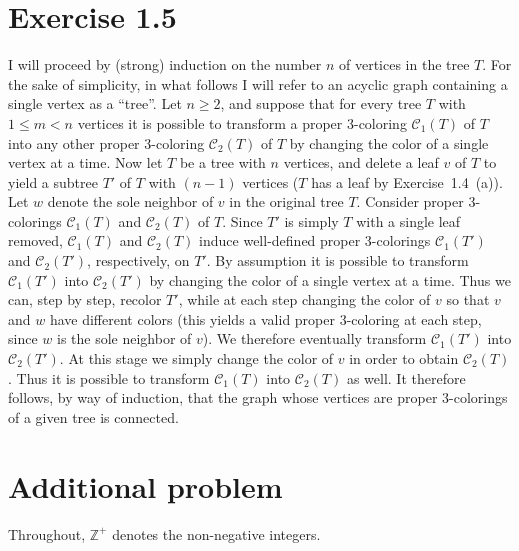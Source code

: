 \documentclass[12pt]{article}
\begin{document}
\section*{Exercise 1.5}

I will proceed by (strong) induction on the number $n$ of vertices in the tree $T$. For the sake of simplicity, in what follows I will refer to an acyclic graph containing a single vertex as a ``tree''. Let $n \geq 2$, and suppose that for every tree $T$ with $1 \leq m < n$ vertices it is possible to transform a proper 3-coloring $\mathcal{C}_1(T)$ of $T$ into any other proper 3-coloring $\mathcal{C}_2(T)$ of $T$ by changing the color of a single vertex at a time. Now let $T$ be a tree with $n$ vertices, and delete a leaf $v$ of $T$ to yield a subtree $T'$ of $T$ with $(n - 1)$ vertices ($T$ has a leaf by Exercise~1.4~(a)). Let $w$ denote the sole neighbor of $v$ in the original tree $T$. Consider proper 3-colorings $\mathcal{C}_1(T)$ and $\mathcal{C}_2(T)$ of $T$. Since $T'$ is simply $T$ with a single leaf removed, $\mathcal{C}_1(T)$ and $\mathcal{C}_2(T)$ induce well-defined proper 3-colorings $\mathcal{C}_1(T')$ and $\mathcal{C}_2(T')$, respectively, on $T'$. By assumption it is possible to transform $\mathcal{C}_1(T')$ into $\mathcal{C}_2(T')$ by changing the color of a single vertex at a time. Thus we can, step by step, recolor $T'$, while at each step changing the color of $v$ so that $v$ and $w$ have different colors (this yields a valid proper 3-coloring at each step, since $w$ is the sole neighbor of $v$). We therefore eventually transform $\mathcal{C}_1(T')$ into $\mathcal{C}_2(T')$. At this stage we simply change the color of $v$ in order to obtain $\mathcal{C}_2(T)$. Thus it is possible to transform $\mathcal{C}_1(T)$ into $\mathcal{C}_2(T)$ as well. It therefore follows, by way of induction, that the graph whose vertices are proper 3-colorings of a given tree is connected.

\section*{Additional problem}

Throughout, $\mathbb{Z}^+$ denotes the non-negative integers.
\end{document}
